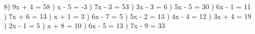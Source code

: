 \documentclass{article}%
\begin{document}
8) 9x + 4 = 58%
\newline%
\newline%
) x - 5 = -3%
\newline%
\newline%
) 7x - 3 = 53%
\newline%
\newline%
) 3x - 3 = 6%
\newline%
\newline%
) 5x - 5 = 30%
\newline%
\newline%
) 6x - 1 = 11%
\newline%
\newline%
) 7x + 6 = 13%
\newline%
\newline%
) x + 1 = 3%
\newline%
\newline%
) 6x - 7 = 5%
\newline%
\newline%
) 5x - 2 = 13%
\newline%
\newline%
) 4x - 4 = 12%
\newline%
\newline%
) 3x + 4 = 19%
\newline%
\newline%
) 2x - 1 = 5%
\newline%
\newline%
) x + 8 = 10%
\newline%
\newline%
) 6x - 5 = 13%
\newline%
\newline%
) 7x - 9 = 33%
\newline%
\newline%
\end{document}
